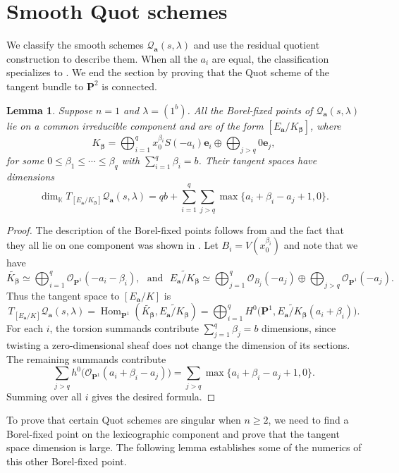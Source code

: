 \documentclass[leqno,11pt,a4paper]{amsart}
\newtheorem{lemma}[lemma]{Lemma}
\theoremstyle{definition}
\numberwithin{equation}{section}
\newcommand{\kk}{\mathbb{K}}
\newcommand{\bfa}{\mathbf{a}}
\newcommand{\PP}{\mathbf{P}}
\newcommand{\bfe}{\mathbf{e}}
\newcommand{\OO}{\mathscr{O}}
\newcommand{\QQ}{\mathcal{Q}}
\DeclareMathOperator{\Hom}{Hom}
\begin{document}
\section{Smooth Quot schemes}
We classify the smooth schemes $\QQ_{\bfa}(s,\lambda)$ and use the residual quotient construction to describe them. 
When all the $a_i$ are equal, the classification specializes to \cite[Theorem~1.1]{SSS26}.
We end the section by proving that the Quot scheme of the tangent bundle to $\PP^2$ is connected.

\begin{lemma}\label{n1Borel}
Suppose $n=1$ and $\lambda=(1^b)$. 
All the Borel-fixed points of $\QQ_{\bfa}(s,\lambda)$ lie on a common irreducible component and are of the form $[E_{\bfa}/K_{\boldsymbol\beta}]$, where
$$
K_{\boldsymbol\beta}
=
\bigoplus_{i=1}^q x_0^{\beta_i}S(-a_i)\bfe_i \oplus \bigoplus_{j>q}0\bfe_j,
$$
for some $ 0\leq\beta_1\leq\cdots\leq\beta_q$ with $\sum_{i=1}^q\beta_i=b$.
Their tangent spaces have dimensions
$$
\dim_\kk T_{[E_{\bfa}/K_{\boldsymbol\beta}]}\QQ_{\bfa}(s,\lambda)
= qb+\sum_{i=1}^q\sum_{j>q} \max\{a_i+\beta_i-a_j+1,0\}.
$$
\end{lemma}

\begin{proof}
The description of the Borel-fixed points follows from  and the fact that they all lie on one component was shown in .
Let $B_i = V(x_0^{\beta_i})$ and note that we have 
$$
\widetilde{K_{\boldsymbol\beta}} \simeq\bigoplus_{i=1}^q\OO_{\PP^1}(-a_i-\beta_i),
\,\, \text{ and } \,\,
\widetilde{E_{\bfa}/K_{\boldsymbol\beta}} \simeq \bigoplus_{j=1}^q\OO_{B_j}(-a_j) \oplus\bigoplus_{j>q}\OO_{\PP^1}(-a_j).
$$
Thus the tangent space to $[E_{\bfa}/K]$ is
$$
T_{[E_{\bfa}/K]}\QQ_{\bfa}(s,\lambda)
= \Hom_{\PP^1}(\widetilde{K_{\boldsymbol\beta}}, \widetilde{E_{\bfa}/K_{\boldsymbol\beta}} )
=
\bigoplus_{i=1}^q
H^0\bigl(\PP^1, \widetilde{E_{\bfa}/K_{\boldsymbol\beta}} (a_i+\beta_i)\bigr).
$$
For each $i$, the torsion summands contribute $\sum_{j=1}^q\beta_j=b$ dimensions, since twisting a zero-dimensional sheaf does not change the dimension of its sections. 
The remaining summands contribute
$$
\sum_{j>q}h^0\bigl(\OO_{\PP^1}(a_i+\beta_i-a_j)\bigr) = \sum_{j>q}\max\{a_i+\beta_i-a_j+1,0\}.
$$
Summing over all $i$ gives the desired formula.
\end{proof} 

To prove that certain Quot schemes are singular when $n\geq 2$, we need to find a Borel-fixed point on the lexicographic component and prove that the tangent space dimension is large. 
The following lemma establishes some of the numerics of this other Borel-fixed point.
\end{document}
